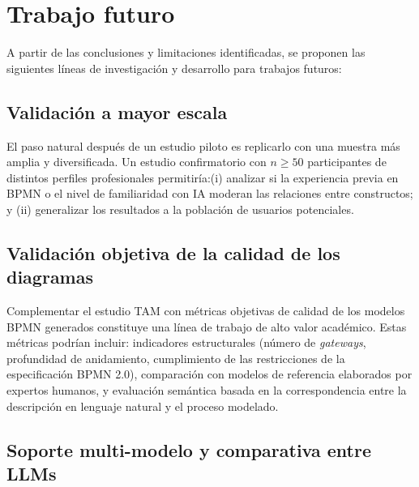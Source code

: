 \section{Trabajo futuro}\label{sec:trabajo-futuro}

A partir de las conclusiones y limitaciones identificadas, se proponen las siguientes líneas de investigación y desarrollo para trabajos futuros:

\subsection{Validación a mayor escala}

El paso natural después de un estudio piloto es replicarlo con una muestra más amplia y diversificada. Un estudio confirmatorio con $n \geq 50$ participantes de distintos perfiles profesionales permitiría:(i) analizar si la experiencia previa en BPMN o el nivel de familiaridad con IA moderan las relaciones entre constructos; y (ii) generalizar los resultados a la población de usuarios potenciales.

\subsection{Validación objetiva de la calidad de los diagramas}

Complementar el estudio TAM con métricas objetivas de calidad de los modelos BPMN generados constituye una línea de trabajo de alto valor académico. Estas métricas podrían incluir: indicadores estructurales (número de \textit{gateways}, profundidad de anidamiento, cumplimiento de las restricciones de la especificación BPMN 2.0), comparación con modelos de referencia elaborados por expertos humanos, y evaluación semántica basada en la correspondencia entre la descripción en lenguaje natural y el proceso modelado.

\subsection{Soporte multi-modelo y comparativa entre LLMs}

